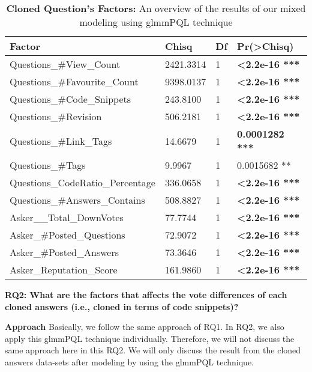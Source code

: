 \documentclass[conference]{IEEEtran}
\begin{document}
\begin{table}[ht]
	\caption{\textbf{Cloned Question's Factors:} An overview of the results of our mixed modeling using \textnormal{glmmPQL} technique}
	\centering
	\begin{tabular}{l l l l}
		\hline\hline
		Factor & Chisq & Df & Pr(\textgreater Chisq) \\ [0.5ex]
		\hline
		Questions\_\#View\_Count   &    2421.3314 & 1 & \textbf{\textless 2.2e-16 ***} \\
		Questions\_\#Favourite\_Count   &     9398.0137 & 1 & \textbf{\textless 2.2e-16 ***}\\
		Questions\_\#Code\_Snippets   &  243.8100 & 1 & \textbf{\textless 2.2e-16 ***}\\
		Questions\_\#Revision &  506.2181 & 1 & \textbf{\textless 2.2e-16 ***}\\
		Questions\_\#Link\_Tags      &        14.6679 &  1 & \textbf{0.0001282 ***}\\
		Questions\_\#Tags      &         9.9967 & 1 & 0.0015682 ** \\
		Questions\_CodeRatio\_Percentage & 336.0658 &  1 &  \textbf{\textless 2.2e-16 ***}\\
		Questions\_\#Answers\_Contains      &    508.8827 & 1 & \textbf{\textless 2.2e-16 ***}\\
		Asker\_\_Total\_DownVotes     &    77.7744 & 1 & \textbf{\textless 2.2e-16 ***}\\
		Asker\_\#Posted\_Questions &  72.9072  & 1 & \textbf{\textless 2.2e-16 ***}\\
		Asker\_\#Posted\_Answers   &  73.3646 & 1 & \textbf{\textless 2.2e-16 ***}\\
		Asker\_Reputation\_Score & 161.9860 & 1 & \textbf{\textless 2.2e-16 ***}\\[1ex]
		\hline
	\end{tabular}
	\label{table:RQOneResutls}
\end{table} 

\textbf{RQ2: What are the factors that affects the vote differences of each cloned answers (i.e., cloned in terms of code snippets)?}\newline

\textbf{Approach} Basically, we follow the same approach of RQ1. In RQ2, we also apply this glmmPQL technique individually. Therefore, we will not discuss the same approach here in this RQ2. We will only discuss the result from the cloned answers data-sets after modeling by using the glmmPQL technique.\newline
\end{document}
